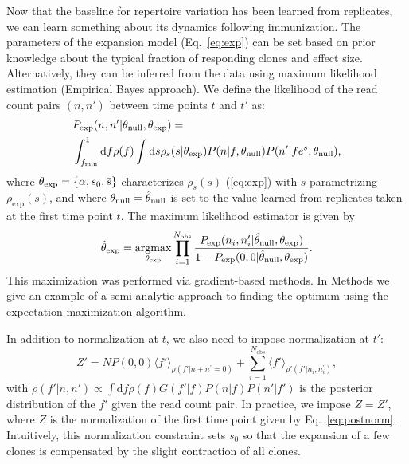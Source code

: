 \documentclass[pre,twocolumn,english,longbibliography]{revtex4}
\DeclareMathOperator*{\argmax}{argmax}
\newcommand{\beq}{\begin{equation}}
\newcommand{\eeq}{\end{equation}}
\newcommand{\<}{\langle}
\renewcommand{\>}{\rangle}
\begin{document}
Now that the baseline for repertoire variation has been learned from replicates, we can learn something about its dynamics following immunization. The parameters of the expansion model (Eq.~\ref{eq:exp}) can be set based on prior knowledge about the typical fraction of responding clones and effect size. Alternatively, they can be inferred from the data using maximum likelihood estimation (Empirical Bayes approach). We define the likelihood of the read count pairs $(n,n')$ between time points $t$ and $t'$ as:
\beq
\begin{split}\label{eq:fullexp}
  &P_{\rm exp}(n,n'|\theta_{\rm null}, \theta_{\rm exp})=\\
  &\int_{f_{\rm min}}^1 \textrm{d}f\rho(f)\int \textrm{d}s\rho_{s}(s|\theta_{\rm exp})P(n|f, \theta_{\rm null})P(n'|fe^s, \theta_{\rm null}),
  \end{split}
  \eeq
where $\theta_{\rm exp}=\{\alpha,s_0,\bar s\}$ characterizes $\rho_s(s)$ (\cref{eq:exp}) with $\bar s$ parametrizing $\rho_{\textrm{exp}}(s)$, and where $\theta_{\rm null}=\hat \theta_{\rm null}$ is set to the value learned from replicates taken at the first time point $t$.
The maximum likelihood estimator is given by
\beq\label{eq:MLEexp}
\hat\theta_{\rm exp}=\argmax_{\theta_{\rm exp}} \prod_{i=1}^{N_{\rm obs}} \frac{P_{\rm exp}(n_i,n'_i|\hat\theta_{\rm null}, \theta_{\rm exp})}{1-P_{\rm exp}(0,0|\hat\theta_{\rm null}, \theta_{\rm exp})}.
\eeq
This maximization was performed via gradient-based methods. In Methods we give an example of a semi-analytic approach to finding the optimum using the expectation maximization algorithm. 

In addition to normalization at $t$, we also need to impose normalization at $t'$:
\beq
Z'=N	P(0,0)\langle f'\rangle_{\rho(f'|n+n^{\prime}=0)} + \sum_{i=1}^{N_{\textrm{obs}}}\langle f'\rangle_{\rho'(f'|n_i,n^{\prime}_i)},
\eeq
with $\rho(f'|n,n')\propto \int \textrm{d}f\rho(f)G(f'|f)P(n|f)P(n'|f')$ is the posterior distribution of the $f'$ given the read count pair. In practice, we impose $Z=Z'$, where $Z$ is the normalization of the first time point given by Eq.~\ref{eq:postnorm}.
Intuitively, this normalization constraint sets $s_0$ so that the expansion of a few clones is compensated by the slight contraction of all clones.
\end{document}
